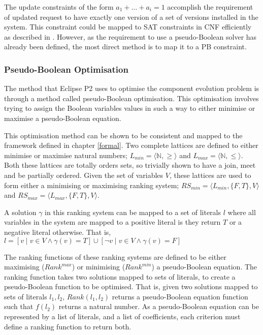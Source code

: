 The update constraints of the form $a_1 + \ldots + a_i = 1$ accomplish the requirement of updated request to have exactly one version of a set of versions installed in the system.
This constraint could be mapped to SAT constraints in CNF efficiently as described in \cite{silva2007}.
However, as the requirement to use a pseudo-Boolean solver has already been defined, the most direct method is to map it to a PB constraint.

\subsubsection{Pseudo-Boolean Optimisation}
The method that Eclipse P2 uses to optimise the component evolution problem is through a method called pseudo-Boolean optimisation.
This optimisation involves trying to assign the Boolean variables values in such a way to either minimise or maximise a pseudo-Boolean equation.

This optimisation method can be shown to be consistent and mapped to the framework defined in chapter \ref{formal}.
Two complete lattices are defined to either minimise or maximise natural numbers; $L_{min} = \langle \mathbb{N}, \geq \rangle$ and $L_{max} = \langle \mathbb{N}, \leq \rangle$.
Both these lattices are totally orders sets, so trivially shown to have a join, meet and be partially ordered.
Given the set of variables $V$, these lattices are used to form either a minimising or maximising  ranking system;
$RS_{min} = \langle L_{min}, \{F,T\}, V \rangle$ and $RS_{max} = \langle L_{max}, \{F,T\}, V \rangle$. 

A solution $\gamma$ in this ranking system can be mapped to a set of literals $l$
where all variables in the system are mapped to a positive literal is they return $T$ or a negative literal otherwise.
That is, $l = [v \mid v \in V \wedge \gamma(v) = T] \cup [\neg v \mid v \in V \wedge \gamma(v) = F]$

The ranking functions of these ranking systems are defined to be either maximising ($Rank^{max}$) or minimising ($Rank^{min}$) a pseudo-Boolean equation.
The ranking function takes two solutions mapped to sets of literals, to create a pseudo-Boolean function to be optimised. 
That is, given two solutions mapped to sets of literals $l_1,l_2$, $Rank(l_1,l_2)$ returns a pseudo-Boolean equation function such that $f(l_2)$ returns a natural number.
As a pseudo-Boolean equation can be represented by a list of literals, and a list of coefficients, each criterion must define a ranking function to return both.

